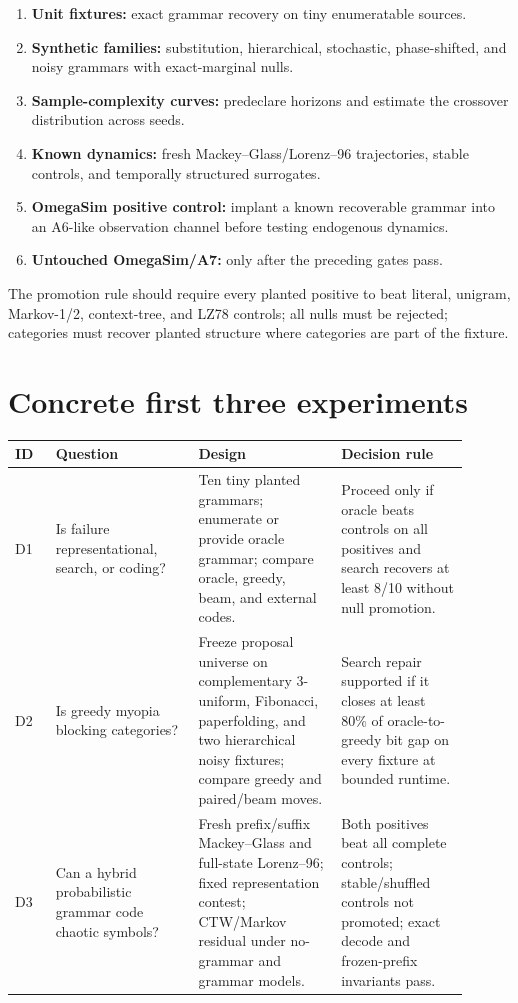 \documentclass[10pt]{article}
\begin{document}
\begin{enumerate}
\item \textbf{Unit fixtures:} exact grammar recovery on tiny enumeratable
sources.
\item \textbf{Synthetic families:} substitution, hierarchical, stochastic,
phase-shifted, and noisy grammars with exact-marginal nulls.
\item \textbf{Sample-complexity curves:} predeclare horizons and estimate the
crossover distribution across seeds.
\item \textbf{Known dynamics:} fresh Mackey--Glass/Lorenz--96 trajectories,
stable controls, and temporally structured surrogates.
\item \textbf{OmegaSim positive control:} implant a known recoverable grammar
into an A6-like observation channel before testing endogenous dynamics.
\item \textbf{Untouched OmegaSim/A7:} only after the preceding gates pass.
\end{enumerate}

The promotion rule should require every planted positive to beat literal,
unigram, Markov-1/2, context-tree, and LZ78 controls; all nulls must be
rejected; categories must recover planted structure where categories are part
of the fixture.

\section{Concrete first three experiments}

\begin{longtable}{p{0.08\linewidth}p{0.28\linewidth}p{0.29\linewidth}p{0.25\linewidth}}
\toprule
ID & Question & Design & Decision rule \\
\midrule
\endhead
D1 & Is failure representational, search, or coding? &
Ten tiny planted grammars; enumerate or provide oracle grammar; compare oracle,
greedy, beam, and external codes. & Proceed only if oracle beats controls on
all positives and search recovers at least 8/10 without null promotion. \\
D2 & Is greedy myopia blocking categories? &
Freeze proposal universe on complementary 3-uniform, Fibonacci, paperfolding,
and two hierarchical noisy fixtures; compare greedy and paired/beam moves. &
Search repair supported if it closes at least 80\% of oracle-to-greedy bit gap
on every fixture at bounded runtime. \\
D3 & Can a hybrid probabilistic grammar code chaotic symbols? &
Fresh prefix/suffix Mackey--Glass and full-state Lorenz--96; fixed
representation contest; CTW/Markov residual under no-grammar and grammar
models. & Both positives beat all complete controls; stable/shuffled controls
not promoted; exact decode and frozen-prefix invariants pass. \\
\bottomrule
\end{longtable}
\end{document}
